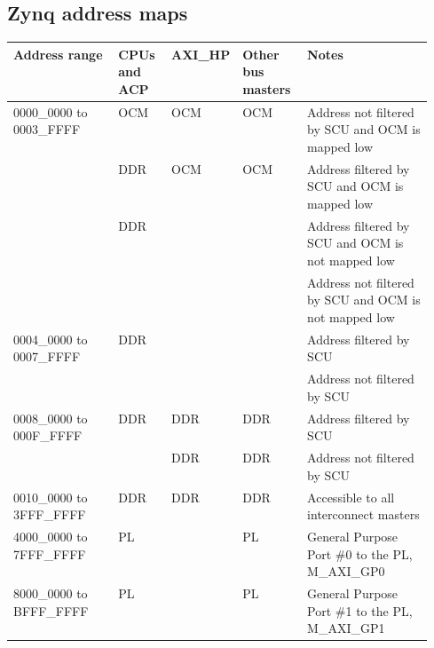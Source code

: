 \begin{appendices}
\chapter{Zynq address maps}
\begin{table}
\centering
\begin{tabular}{p{0.25\linewidth}lllp{0.3\linewidth}}
Address range                             & CPUs and ACP & AXI\_HP & Other bus masters & Notes                                                 \\
\hline
\multirow{4}{*}{0000\_0000 to 0003\_FFFF} & OCM          & OCM     & OCM               & Address not filtered by SCU and OCM is mapped low     \\
                                          & DDR          & OCM     & OCM               & Address filtered by SCU and OCM is mapped low         \\
                                          & DDR          &         &                   & Address filtered by SCU and OCM is not mapped low     \\
                                          &              &         &                   & Address not filtered by SCU and OCM is not mapped low \\
\multirow{2}{*}{0004\_0000 to 0007\_FFFF} & DDR          &         &                   & Address filtered by SCU                               \\
                                          &              &         &                   & Address not filtered by SCU                           \\
\multirow{2}{*}{0008\_0000 to 000F\_FFFF} & DDR          & DDR     & DDR               & Address filtered by SCU                               \\
                                          &              & DDR     & DDR               & Address not filtered by SCU                           \\
0010\_0000 to 3FFF\_FFFF                  & DDR          & DDR     & DDR               & Accessible to all interconnect masters                \\
4000\_0000 to 7FFF\_FFFF                  & PL           &         & PL                & General Purpose Port \#0 to the PL, M\_AXI\_GP0       \\
8000\_0000 to BFFF\_FFFF                  & PL           &         & PL                & General Purpose Port \#1 to the PL, M\_AXI\_GP1       \\

\end{tabular}
\end{table}
\end{appendices}
